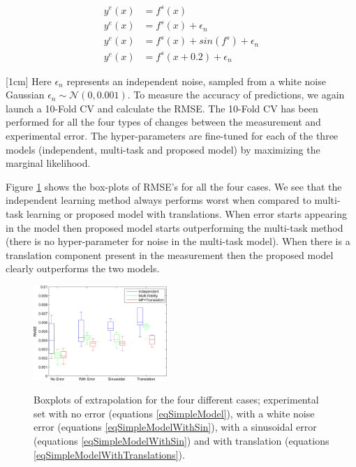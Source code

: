 \begin{align}
	y^{e}(x) & = f^{s}(x) \label{eqSimpleModel} \\
	y^{e}(x) & = f^{s}(x) + \epsilon_{n} \label{eqSimpleModelWithError} \\
	y^{e}(x) & = f^{s}(x) + sin(f^{s}) + \epsilon_{n} \label{eqSimpleModelWithSin} \\
	y^{e}(x) & = f^{s}(x + 0.2) + \epsilon_{n} \label{eqSimpleModelWithTranslations}
\end{align}

[1cm]
Here $\epsilon_{n}$ represents an independent noise, sampled from a white noise Gaussian $\epsilon_{n} \sim \mathcal{N}(0, 0.001)$. To measure the accuracy of predictions, we again launch a 10-Fold CV and calculate the RMSE. The 10-Fold CV has been performed for all the four types of changes between the measurement and experimental error. The hyper-parameters are fine-tuned for each of the three models (independent, multi-task and proposed model) by maximizing the marginal likelihood. 

Figure \ref{figResultsOfExtrapolation} shows the box-plots of RMSE's for all the four cases. We see that the independent learning method always performs worst when compared to multi-task learning or proposed model with translations. When error starts appearing in the model then proposed model starts outperforming the multi-task method (there is no hyper-parameter for noise in the multi-task model). When there is a translation component present in the measurement then the proposed model clearly outperforms the two models.

\begin{figure}[!ht]
  \centering
        \includegraphics[width=0.45\textwidth]
        {images/part3/boxPlotsClAlphaAccuracyMeasure}
        \label{subFigboxPlotsClAlphaAccuracyMeasure}
       \caption{Boxplots of extrapolation for the four different cases; experimental set with no error (equations \ref{eqSimpleModel}), with a white noise error (equations \ref{eqSimpleModelWithSin}), with a sinusoidal error (equations \ref{eqSimpleModelWithSin}) and with translation (equations \ref{eqSimpleModelWithTranslations}). }
       \label{figResultsOfExtrapolation}
\end{figure}

